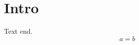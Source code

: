 \documentclass[a4paper]{mysmfend}
\begin{document}
\section{Intro}
Text \smaller{} end.
\begin{equation}a=b\end{equation}
\end{document}
